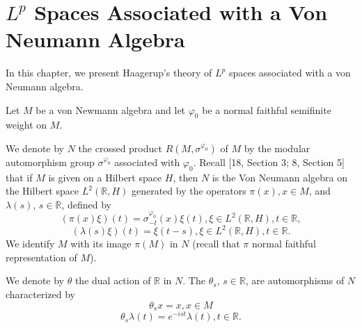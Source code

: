 
% 
\chapter{$L^p$ Spaces Associated with a Von Neumann Algebra}
In this chapter, we present Haagerup's theory of $L^p$ spaces associated with a von Neumann algebra.\par
Let $M$ be a von Newmann algebra and let $\varphi_0$ be a normal faithful semifinite weight on $M$.\par
We denote by $N$ the crossed product $R(M,\sigma^{\varphi_0})$ of $M$ by the modular automorphism group $\sigma^{\varphi_0}$ associated with $\varphi_0$. Recall [18, Section 3; 8, Section 5] that if $M$ is given on a Hilbert space $H$, then $N$ is the Von Neumann algebra on the Hilbert space $L^2(\mathbb{R},H)$ generated by the operators $\pi(x),x\in M$, and $\lambda(s)$, $s\in \mathbb{R}$, defined by
\begin{equation}
    (\pi(x)\xi)(t)=\sigma_{-t}^{\varphi_0}(x)\xi(t),\xi\in L^2(\mathbb{R},H),t\in \mathbb{R},
\end{equation}
\begin{equation}
    (\lambda(s)\xi)(t)=\xi(t-s),\xi\in L^2(\mathbb{R},H),t\in \mathbb{R}.
\end{equation}
We identify $M$ with its image $\pi(M)$ in $N$ (recall that $\pi$ normal faithful representation of $M$).\par
We denote by $\theta$ the dual action of $\mathbb{R}$ in $N$. The $\theta_s$, $s\in \mathbb{R}$, are automorphisms of $N$ characterized by
\begin{equation}\label{Chap2: eqn: 3}
    \theta_s x=x, x\in M
\end{equation}
\begin{equation}
    \theta_s\lambda(t)=e^{-ist}\lambda(t),t\in \mathbb{R}.
\end{equation}
